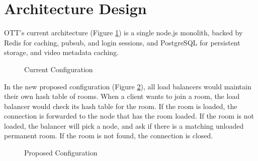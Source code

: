 \newpage

\section{Architecture Design}

OTT's current architecture (Figure \ref{Figure::old-architecture}) is a single node.js monolith, backed by Redis
for caching, pubsub, and login sessions, and PostgreSQL for persistent
storage, and video metadata caching.

\begin{figure}[htb]
  \centering
  \caption{\label{Figure::old-architecture} Current Configuration}
\end{figure}

In the new proposed configuration (Figure \ref{Figure::new-architecture}), all
load balancers would maintain their own hash table of rooms. When a client
wants to join a room, the load balancer would check its hash table for the
room. If the room is loaded, the connection is forwarded to the node that
has the room loaded. If the room is not loaded, the balancer will pick a node,
and ask if there is a matching unloaded permanent room. If the room is not found,
the connection is closed.

\begin{figure}[htb]
  \centering
  \caption{\label{Figure::new-architecture} Proposed Configuration}
\end{figure}

